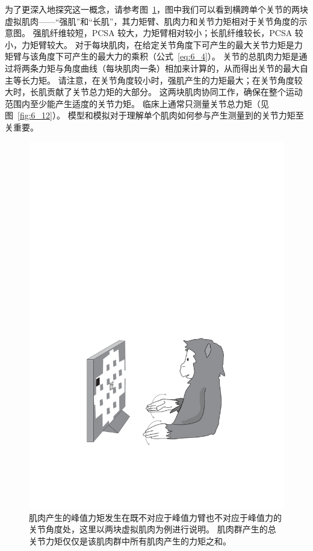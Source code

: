 为了更深入地探究这一概念，请参考图~\ref{fig:6_13}，图中我们可以看到横跨单个关节的两块虚拟肌肉——“强肌”和“长肌”，其力矩臂、肌肉力和关节力矩相对于关节角度的示意图。
强肌纤维较短，PCSA 较大，力矩臂相对较小；长肌纤维较长，PCSA 较小，力矩臂较大。
对于每块肌肉，在给定关节角度下可产生的最大关节力矩是力矩臂与该角度下可产生的最大力的乘积（公式~\ref{eq:6_4}）。
关节的总肌肉力矩是通过将两条力矩与角度曲线（每块肌肉一条）相加来计算的，从而得出关节的最大自主等长力矩。
请注意，在关节角度较小时，强肌产生的力矩最大；在关节角度较大时，长肌贡献了关节总力矩的大部分。
这两块肌肉协同工作，确保在整个运动范围内至少能产生适度的关节力矩。
临床上通常只测量关节总力矩（见图~\ref{fig:6_12}）。
模型和模拟对于理解单个肌肉如何参与产生测量到的关节力矩至关重要。


\begin{figure}[!htb]
	\centering
	\includegraphics[width=1.0\linewidth]{chap6/6_13}
	\caption{肌肉产生的峰值力矩发生在既不对应于峰值力臂也不对应于峰值力的关节角度处，这里以两块虚拟肌肉为例进行说明。
		肌肉群产生的总关节力矩仅仅是该肌肉群中所有肌肉产生的力矩之和。 \label{fig:6_13}}
\end{figure}



